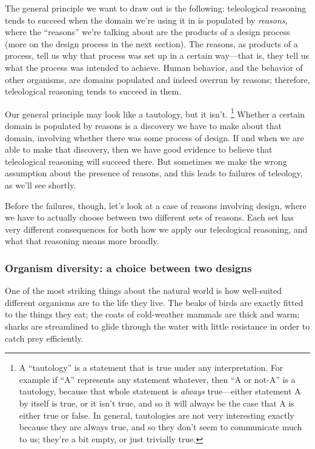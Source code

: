 		The general principle we want to draw out is the following: teleological reasoning tends to succeed when the domain we're using it in is populated by \textit{reasons}, where the ``reasons'' we're talking about are the products of a design process (more on the design process in the next section). The reasons, as products of a process, tell us why that process was set up in a certain way---that is, they tell us what the process was intended to achieve. Human behavior, and the behavior of other organisms, are domains populated and indeed overrun by reasons; therefore, teleological reasoning tends to succeed in them.
		
		Our general principle may look like a tautology, but it isn't.%
			\footnote{A ``tautology'' is a statement that is true under any interpretation. For example if ``A'' represents any statement whatever, then ``A or not-A'' is a tautology, because that whole statement is \textit{always} true---either statement A by itself is true, or it isn't true, and so it will always be the case that A is either true or false. In general, tautologies are not very interesting exactly because they are always true, and so they don't seem to communicate much to us; they're a bit empty, or just trivially true.}
		Whether a certain domain is populated by reasons is a discovery we have to make about that domain, involving whether there was some process of design. If and when we are able to make that discovery, then we have good evidence to believe that teleological reasoning will succeed there. But sometimes we make the wrong assumption about the presence of reasons, and this leads to failures of teleology, as we'll see shortly.
		
		Before the failures, though, let's look at a case of reasons involving design, where we have to actually choose between two different sets of reasons. Each set has very different consequences for both how we apply our teleological reasoning, and what that reasoning means more broadly.
		
	\subsubsection{Organism diversity: a choice between two designs}
	
		One of the most striking things about the natural world is how well-suited different organisms are to the life they live. The beaks of birds are exactly fitted to the things they eat; the coats of cold-weather mammals are thick and warm; sharks are streamlined to glide through the water with little resistance in order to catch prey efficiently.
		
